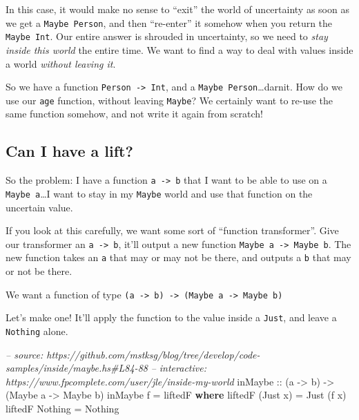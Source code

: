 \documentclass[]{article}
\newenvironment{Shaded}{}{}
\newcommand{\KeywordTok}[1]{\textcolor[rgb]{0.00,0.44,0.13}{\textbf{{#1}}}}
\newcommand{\DataTypeTok}[1]{\textcolor[rgb]{0.56,0.13,0.00}{{#1}}}
\newcommand{\CommentTok}[1]{\textcolor[rgb]{0.38,0.63,0.69}{\textit{{#1}}}}
\newcommand{\OtherTok}[1]{\textcolor[rgb]{0.00,0.44,0.13}{{#1}}}
\newcommand{\FunctionTok}[1]{\textcolor[rgb]{0.02,0.16,0.49}{{#1}}}
\newcommand{\NormalTok}[1]{{#1}}
\begin{document}
In this case, it would make no sense to ``exit'' the world of uncertainty as soon as we get a
\texttt{Maybe\ Person}, and then ``re-enter'' it somehow when you return the \texttt{Maybe\ Int}.
Our entire answer is shrouded in uncertainty, so we need to \emph{stay inside this world} the entire
time. We want to find a way to deal with values inside a world \emph{without leaving it}.

So we have a function \texttt{Person\ -\textgreater{}\ Int}, and a
\texttt{Maybe\ Person}\ldots{}darnit. How do we use our \texttt{age} function, without leaving
\texttt{Maybe}? We certainly want to re-use the same function somehow, and not write it again from
scratch!

\subsection{Can I have a lift?}\label{can-i-have-a-lift}

So the problem: I have a function \texttt{a\ -\textgreater{}\ b} that I want to be able to use on a
\texttt{Maybe\ a}\ldots{}I want to stay in my \texttt{Maybe} world and use that function on the
uncertain value.

If you look at this carefully, we want some sort of ``function transformer''. Give our transformer
an \texttt{a\ -\textgreater{}\ b}, it'll output a new function
\texttt{Maybe\ a\ -\textgreater{}\ Maybe\ b}. The new function takes an \texttt{a} that may or may
not be there, and outputs a \texttt{b} that may or not be there.

We want a function of type
\texttt{(a\ -\textgreater{}\ b)\ -\textgreater{}\ (Maybe\ a\ -\textgreater{}\ Maybe\ b)}

Let's make one! It'll apply the function to the value inside a \texttt{Just}, and leave a
\texttt{Nothing} alone.

\begin{Shaded}
\begin{Highlighting}[]
\CommentTok{-- source: https://github.com/mstksg/blog/tree/develop/code-samples/inside/maybe.hs#L84-88}
\CommentTok{-- interactive: https://www.fpcomplete.com/user/jle/inside-my-world}
\OtherTok{inMaybe ::} \NormalTok{(a }\OtherTok{->} \NormalTok{b) }\OtherTok{->} \NormalTok{(}\DataTypeTok{Maybe} \NormalTok{a }\OtherTok{->} \DataTypeTok{Maybe} \NormalTok{b)}
\NormalTok{inMaybe f }\FunctionTok{=} \NormalTok{liftedF}
  \KeywordTok{where}
    \NormalTok{liftedF (}\DataTypeTok{Just} \NormalTok{x) }\FunctionTok{=} \DataTypeTok{Just} \NormalTok{(f x)}
    \NormalTok{liftedF }\DataTypeTok{Nothing}  \FunctionTok{=} \DataTypeTok{Nothing}
\end{Highlighting}
\end{Shaded}
\end{document}
